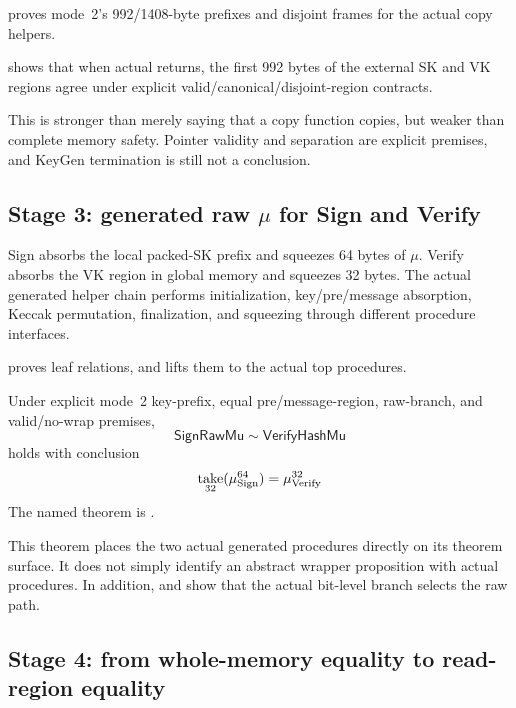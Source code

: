  proves mode~2's 992/1408-byte prefixes and
disjoint frames for the actual copy helpers.

\begin{verified}
 shows that when actual
 returns, the first 992
bytes of the external SK and VK regions agree under explicit
valid/canonical/disjoint-region contracts.
\end{verified}

This is stronger than merely saying that a copy function copies, but weaker
than complete memory safety. Pointer validity and separation are explicit
premises, and KeyGen termination is still not a conclusion.

\subsection{Stage 3: generated raw \texorpdfstring{\(\mu\)}{mu} for Sign and Verify}

Sign absorbs the local packed-SK prefix and squeezes 64 bytes of \(\mu\).
Verify absorbs the VK region in global memory and squeezes 32 bytes.
The actual generated helper chain performs initialization, key/pre/message
absorption, Keccak permutation, finalization, and squeezing through different
procedure interfaces.

 proves leaf relations, and
 lifts them to the actual top procedures.

\begin{verified}
Under explicit mode~2 key-prefix, equal pre/message-region, raw-branch,
and valid/no-wrap premises,
\[
  \mathsf{SignRawMu}\sim\mathsf{VerifyHashMu}
\]
holds with conclusion
\[
  \mathop{\mathrm{take}}_{32}(\mu^{64}_{\mathrm{Sign}})
  =\mu^{32}_{\mathrm{Verify}}
\]
The named theorem is
.
\end{verified}

This theorem places the two actual generated procedures directly on its
theorem surface. It does not simply identify an abstract wrapper proposition
with actual procedures.
In addition,  and
 show that the actual bit-level branch
selects the raw path.

\subsection{Stage 4: from whole-memory equality to read-region equality}

